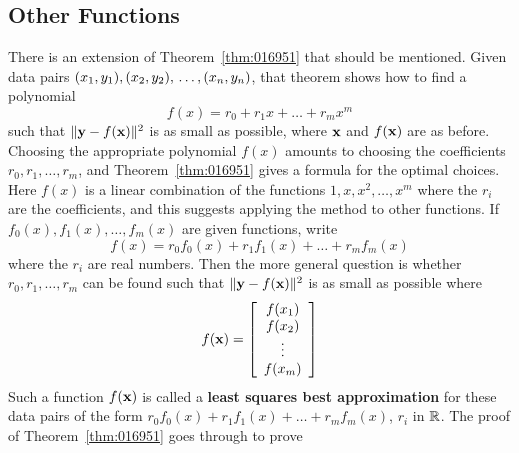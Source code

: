 \subsection*{Other Functions}
There is an extension of Theorem~\ref{thm:016951} that should be mentioned. Given data pairs $(x_{1}, y_{1}), (x_{2}, y_{2}), \\ \dots, (x_{n}, y_{n})$, that theorem shows how to find a polynomial
\begin{equation*}
f(x) = r_0 + r_1x + \dots + r_mx^m 
\end{equation*}
such that $\|\textbf{y} - f(\textbf{x})\|^{2}$ is as small as possible, where $\textbf{x}$ and $f(\textbf{x})$ are as before. Choosing the appropriate polynomial $f(x)$ amounts to choosing the coefficients $r_{0}, r_{1}, \dots, r_{m}$, and Theorem~\ref{thm:016951} gives a formula for the optimal choices. Here $f(x)$ is a linear combination of the functions $1, x, x^{2}, \dots, x^{m}$ where the $r_{i}$ are the coefficients, and this suggests applying the method to other functions. If $f_{0}(x), f_{1}(x), \dots, f_{m}(x)$ are given functions, write
\begin{equation*}
f(x) = r_0f_0(x) + r_1f_1(x) + \dots + r_mf_m(x)
\end{equation*}
where the $r_{i}$ are real numbers. Then the more general question is whether $r_{0}, r_{1}, \dots, r_{m}$ can be found such that $\|\textbf{y} - f(\textbf{x})\|^{2}$ is as small as possible where
\begin{equation*}
f(\textbf{x}) =
\left[ \begin{array}{c}
f(x_1) \\
f(x_2) \\
\vdots \\
f(x_m)
\end{array} \right]
\end{equation*}
Such a function $f(\textbf{x})$ is called a \textbf{least squares best approximation} for these data pairs of the form $r_{0}f_{0}(x) + r_{1}f_{1}(x) + \dots + r_{m}f_{m}(x)$, $r_{i}$ in $\mathbb{R}$. The proof of Theorem~\ref{thm:016951} goes through to prove

